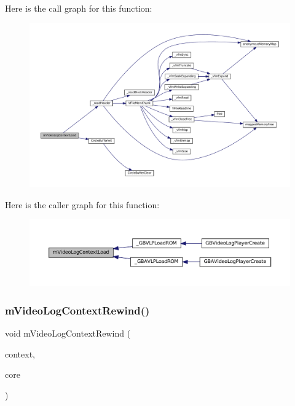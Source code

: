 Here is the call graph for this function\+:
\nopagebreak
\begin{figure}[H]
\begin{center}
\leavevmode
\includegraphics[width=350pt]{video-logger_8c_ab20aa19e19c6e5eb89100137495bfef1_cgraph}
\end{center}
\end{figure}
Here is the caller graph for this function\+:
\nopagebreak
\begin{figure}[H]
\begin{center}
\leavevmode
\includegraphics[width=350pt]{video-logger_8c_ab20aa19e19c6e5eb89100137495bfef1_icgraph}
\end{center}
\end{figure}
\mbox{\label{video-logger_8c_aea08663b76690e7220b3f8377f971785}} 
\subsubsection{\texorpdfstring{m\+Video\+Log\+Context\+Rewind()}{mVideoLogContextRewind()}}
{\footnotesize\ttfamily void m\+Video\+Log\+Context\+Rewind (\begin{DoxyParamCaption}\item[{struct m\+Video\+Log\+Context $\ast$}]{context,  }\item[{struct m\+Core $\ast$}]{core }\end{DoxyParamCaption})}

